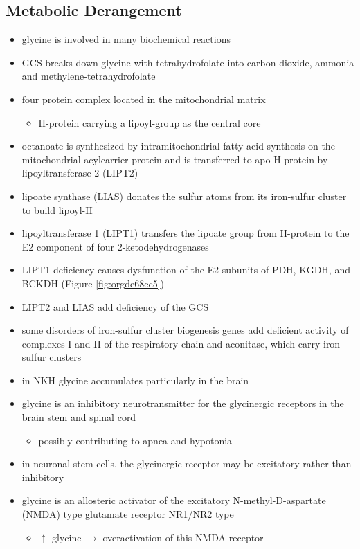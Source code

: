 \documentclass[12pt]{scrartcl}
\begin{document}
\begin{center}
\begin{center}
\subsection{Metabolic Derangement}
\label{sec:org7114d1a}
\begin{itemize}
\item glycine is involved in many biochemical reactions
\item GCS breaks down glycine with tetrahydrofolate into carbon dioxide,
ammonia and methylene-tetrahydrofolate
\item four protein complex located in the mitochondrial matrix
\begin{itemize}
\item H-protein carrying a lipoyl-group as the central core
\end{itemize}
\item octanoate is synthesized by intramitochondrial fatty acid synthesis
on the mitochondrial acylcarrier protein and is transferred to apo-H
protein by lipoyltransferase 2 (LIPT2)
\item lipoate synthase (LIAS) donates the sulfur atoms from its
iron-sulfur cluster to build lipoyl-H
\item lipoyltransferase 1 (LIPT1) transfers the lipoate group from
H-protein to the E2 component of four 2-ketodehydrogenases
\item LIPT1 deficiency causes dysfunction of the E2 subunits of PDH, KGDH,
and BCKDH (Figure \ref{fig:orgde68ec5})
\item LIPT2 and LIAS add deficiency of the GCS
\item some disorders of iron-sulfur cluster biogenesis genes add deficient
activity of complexes I and II of the respiratory chain and
aconitase, which carry iron sulfur clusters
\item in NKH glycine accumulates particularly in the brain
\item glycine is an inhibitory neurotransmitter for the glycinergic
receptors in the brain stem and spinal cord
\begin{itemize}
\item possibly contributing to apnea and hypotonia
\end{itemize}
\item in neuronal stem cells, the glycinergic receptor may be excitatory
rather than inhibitory
\item glycine is an allosteric activator of the excitatory
N-methyl-D-aspartate (NMDA) type glutamate receptor NR1/NR2 type
\begin{itemize}
\item \(\uparrow\) glycine \(\to\) overactivation of this NMDA receptor
\end{itemize}
\end{itemize}

\end{center}
\end{center}
\end{document}
